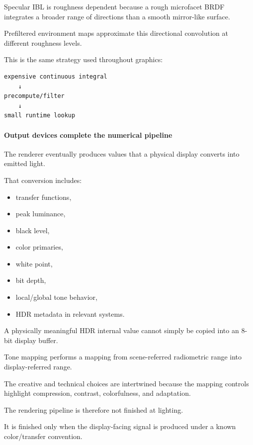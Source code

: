 Specular IBL is roughness dependent because a rough microfacet BRDF integrates a broader range of directions than a smooth mirror-like surface.

Prefiltered environment maps approximate this directional convolution at different roughness levels.

This is the same strategy used throughout graphics:

\begin{verbatim}
expensive continuous integral
    ↓
precompute/filter
    ↓
small runtime lookup
\end{verbatim}

\paragraph{Output devices complete the numerical pipeline}\label{03-visual-computing-i-ch001-output-devices-complete-the-numerical-pipeline}

\hypertarget{03-visual-computing-i-ch001-output-devices-complete-the-numerical-pipeline}{}

The renderer eventually produces values that a physical display converts into emitted light.

That conversion includes:

\begin{itemize}
\tightlist
\item
  transfer functions,
\item
  peak luminance,
\item
  black level,
\item
  color primaries,
\item
  white point,
\item
  bit depth,
\item
  local/global tone behavior,
\item
  HDR metadata in relevant systems.
\end{itemize}

A physically meaningful HDR internal value cannot simply be copied into an 8-bit display buffer.

Tone mapping performs a mapping from scene-referred radiometric range into display-referred range.

The creative and technical choices are intertwined because the mapping controls highlight compression, contrast, colorfulness, and adaptation.

The rendering pipeline is therefore not finished at lighting.

It is finished only when the display-facing signal is produced under a known color/transfer convention.


